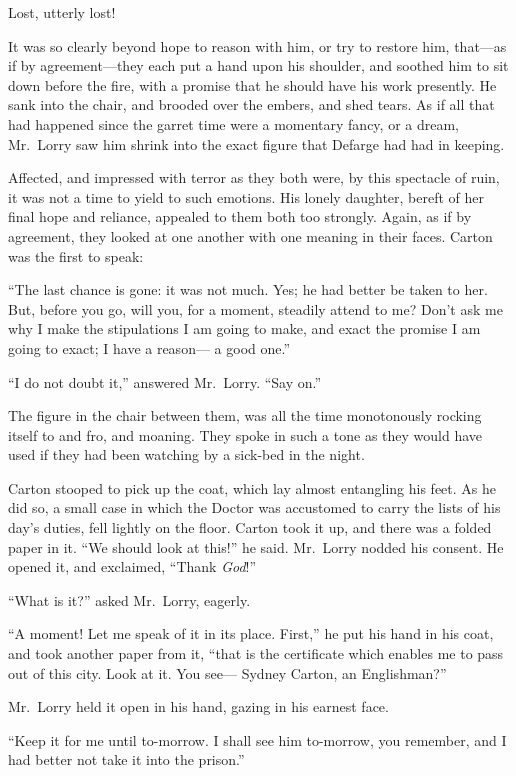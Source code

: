 Lost, utterly lost!

It was so clearly beyond hope to reason with him, or try to restore him,
that---as if by agreement---they each put a hand upon his shoulder,
and soothed him to sit down before the fire, with a promise that he
should have his work presently.  He sank into the chair, and brooded
over the embers, and shed tears.  As if all that had happened since
the garret time were a momentary fancy, or a dream, Mr.\ Lorry saw him
shrink into the exact figure that Defarge had had in keeping.

Affected, and impressed with terror as they both were, by this
spectacle of ruin, it was not a time to yield to such emotions.
His lonely daughter, bereft of her final hope and reliance, appealed
to them both too strongly. Again, as if by agreement, they looked at
one another with one meaning in their faces.
Carton was the first to speak:

``The last chance is gone:  it was not much.  Yes; he had better be
taken to her.  But, before you go, will you, for a moment, steadily
attend to me?  Don't ask me why I make the stipulations I am going to
make, and exact the promise I am going to exact; I have a reason---%
a good one.''

``I do not doubt it,'' answered Mr.\ Lorry.  ``Say on.''

The figure in the chair between them, was all the time monotonously
rocking itself to and fro, and moaning.  They spoke in such a tone as
they would have used if they had been watching by a sick-bed in the night.

Carton stooped to pick up the coat, which lay almost entangling his feet.
As he did so, a small case in which the Doctor was accustomed to
carry the lists of his day's duties, fell lightly on the floor.
Carton took it up, and there was a folded paper in it.  ``We should
look at this!'' he said. Mr.\ Lorry nodded his consent.  He opened it,
and exclaimed, ``Thank \emph{God}!''

``What is it?'' asked Mr.\ Lorry, eagerly.

``A moment!  Let me speak of it in its place.  First,'' he put his hand
in his coat, and took another paper from it, ``that is the certificate
which enables me to pass out of this city.  Look at it.  You see---%
Sydney Carton, an Englishman?''

Mr.\ Lorry held it open in his hand, gazing in his earnest face.

``Keep it for me until to-morrow.  I shall see him to-morrow,
you remember, and I had better not take it into the prison.''

